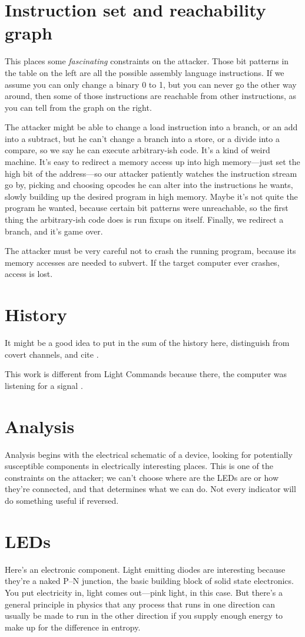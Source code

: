 \documentclass[letterpaper]{article}
\begin{document}
\section{Instruction set and reachability graph}
This places some \emph{fascinating} constraints on the attacker. Those bit
patterns in the table on the left are all the possible assembly language
instructions. If we assume you can only change a binary 0 to 1, but you can
never go the other way around, then some of those instructions are reachable
from other instructions, as you can tell from the graph on the right.

The attacker might be able to change a load instruction into a branch, or an
add into a subtract, but he can't change a branch into a store, or a divide
into a compare, so we say he can execute arbitrary-ish code. It's a kind of
weird machine. It's easy to redirect a memory access up into high memory---just
set the high bit of the address---so our attacker patiently watches the
instruction stream go by, picking and choosing opcodes he can alter into the
instructions he wants, slowly building up the desired program in high memory.
Maybe it's not quite the program he wanted, because certain bit patterns were
unreachable, so the first thing the arbitrary-ish code does is run fixups on
itself. Finally, we redirect a branch, and it's game over.

The attacker must be very careful not to crash the running program, because its
memory accesses are needed to subvert. If the target computer ever crashes,
access is lost.
\section{History}
It might be a good idea to put in the sum of the history here, distinguish from
covert channels, and cite \cite{Kuhnapfel2021b}.

This work is different from Light Commands because there, the computer was
listening for a signal \cite{Sugawara2019,Rampazzi2020}.
\section{Analysis}
Analysis begins with the electrical schematic of a device, looking for
potentially susceptible components in electrically interesting places. This is
one of the constraints on the attacker; we can't choose where are the LEDs are
or how they're connected, and that determines what we can do. Not every
indicator will do something useful if reversed.
\section{LEDs}
Here's an electronic component. Light emitting diodes are interesting because
they're a naked P--N junction, the basic building block of solid state
electronics. You put electricity in, light comes out---pink light, in this
case. But there's a general principle in physics that any process that runs in
one direction can usually be made to run in the other direction if you supply
enough energy to make up for the difference in entropy.
\end{document}
